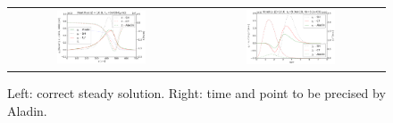 \documentclass[preprint,12pt]{elsarticle}
\newcommand{\figscale}{0.5}
\begin{document}
\begin{figure}[tbh]
  \begin{center}
    \begin{tabular}{cc}
      \includegraphics[width=\figscale\textwidth]{../VFPdata/C7_Aladin_case3_heatflux.png} &
      \includegraphics[width=\figscale\textwidth]{../VFPdata/C7_Aladin_case3_kinetics.png}
    \end{tabular}
  \caption{  
  Left: correct steady solution. Right: time and point to be precised by Aladin.
  }
  \end{center}
  \label{fig:C7_Aladin_case3}
\end{figure}
\end{document}
